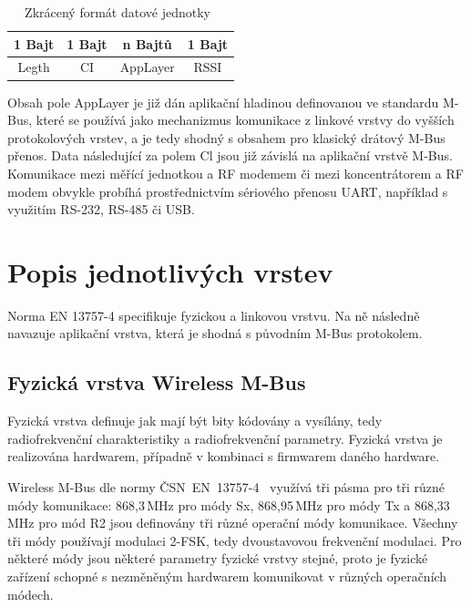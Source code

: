 			
			\begin{table}[!ht]
			\vspace{-10pt}
\centering
\begin{tabular}{cccc}
1 Bajt & 1 Bajt & n Bajtů & 1 Bajt \\ \hline
\multicolumn{1}{|c|}{Legth} & \multicolumn{1}{c|}{CI} & \multicolumn{1}{c|}{AppLayer} & \multicolumn{1}{c|}{RSSI} \\ \hline
\end{tabular}
\caption{Zkrácený formát datové jednotky~\cite{FormatDatoveJednotky}}
\label{PaketWm3}
\vspace{-20pt}
\end{table}
			
Obsah pole AppLayer je již dán aplikační hladinou definovanou ve standardu M-Bus, které se používá jako mechanizmus komunikace z linkové vrstvy do vyšších protokolových vrstev, a je tedy shodný s obsahem pro klasický drátový M-Bus přenos.  Data následující za polem Cl jsou již závislá na aplikační vrstvě M-Bus. Komunikace mezi měřící jednotkou a RF modemem či mezi koncentrátorem a RF modem obvykle probíhá prostřednictvím sériového přenosu UART, například s využitím RS-232, RS-485 či USB.





\section{Popis jednotlivých vrstev}

Norma EN 13757-4 specifikuje fyzickou a linkovou vrstvu. Na ně následně navazuje aplikační vrstva, která je shodná s původním M-Bus protokolem.

\subsection{Fyzická vrstva Wireless M-Bus}
Fyzická vrstva definuje jak mají být bity kódovány a vysílány, tedy radiofrekvenční charakteristiky a radiofrekvenční parametry. Fyzická vrstva je realizována hardwarem, případně v kombinaci s firmwarem daného hardware.

Wireless M-Bus dle normy ČSN~EN~13757-4~\cite{Norma4} využívá tři pásma pro tři různé módy komunikace: 868,3\,MHz pro módy Sx, 868,95\,MHz pro módy Tx a 868,33\,MHz pro mód R2 jsou definovány tři různé operační módy komunikace. Všechny tři módy používají modulaci 2-FSK, tedy dvoustavovou frekvenční modulaci. Pro některé módy jsou některé parametry fyzické vrstvy stejné, proto je fyzické zařízení schopné s nezměněným hardwarem komunikovat v různých operačních módech.


